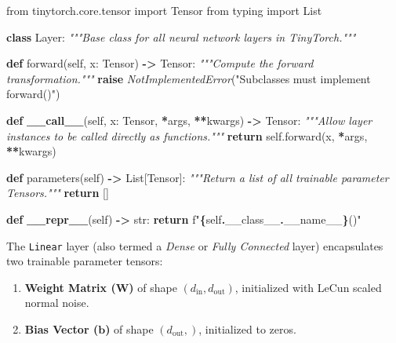 \documentclass[
  letterpaper,
]{scrbook}
\newenvironment{Shaded}{\begin{snugshade}}{\end{snugshade}}
\newcommand{\BuiltInTok}[1]{#1}
\newcommand{\CommentTok}[1]{\textcolor[rgb]{0.56,0.35,0.01}{\textit{#1}}}
\newcommand{\ControlFlowTok}[1]{\textcolor[rgb]{0.13,0.29,0.53}{\textbf{#1}}}
\newcommand{\FunctionTok}[1]{\textcolor[rgb]{0.13,0.29,0.53}{\textbf{#1}}}
\newcommand{\ImportTok}[1]{#1}
\newcommand{\KeywordTok}[1]{\textcolor[rgb]{0.13,0.29,0.53}{\textbf{#1}}}
\newcommand{\NormalTok}[1]{#1}
\newcommand{\OperatorTok}[1]{\textcolor[rgb]{0.81,0.36,0.00}{\textbf{#1}}}
\newcommand{\PreprocessorTok}[1]{\textcolor[rgb]{0.56,0.35,0.01}{\textit{#1}}}
\newcommand{\SpecialCharTok}[1]{\textcolor[rgb]{0.81,0.36,0.00}{\textbf{#1}}}
\newcommand{\SpecialStringTok}[1]{\textcolor[rgb]{0.31,0.60,0.02}{#1}}
\newcommand{\StringTok}[1]{\textcolor[rgb]{0.31,0.60,0.02}{#1}}
\newcommand{\VariableTok}[1]{\textcolor[rgb]{0.00,0.00,0.00}{#1}}
\providecommand{\tightlist}{%
  \setlength{\itemsep}{0pt}\setlength{\parskip}{0pt}}
\begin{document}
\begin{Shaded}
\begin{Highlighting}[]
\ImportTok{from}\NormalTok{ tinytorch.core.tensor }\ImportTok{import}\NormalTok{ Tensor}
\ImportTok{from}\NormalTok{ typing }\ImportTok{import}\NormalTok{ List}

\KeywordTok{class}\NormalTok{ Layer:}
    \CommentTok{"""Base class for all neural network layers in TinyTorch."""}

    \KeywordTok{def}\NormalTok{ forward(}\VariableTok{self}\NormalTok{, x: Tensor) }\OperatorTok{{-}\textgreater{}}\NormalTok{ Tensor:}
        \CommentTok{"""Compute the forward transformation."""}
        \ControlFlowTok{raise} \PreprocessorTok{NotImplementedError}\NormalTok{(}\StringTok{"Subclasses must implement forward()"}\NormalTok{)}

    \KeywordTok{def} \FunctionTok{\_\_call\_\_}\NormalTok{(}\VariableTok{self}\NormalTok{, x: Tensor, }\OperatorTok{*}\NormalTok{args, }\OperatorTok{**}\NormalTok{kwargs) }\OperatorTok{{-}\textgreater{}}\NormalTok{ Tensor:}
        \CommentTok{"""Allow layer instances to be called directly as functions."""}
        \ControlFlowTok{return} \VariableTok{self}\NormalTok{.forward(x, }\OperatorTok{*}\NormalTok{args, }\OperatorTok{**}\NormalTok{kwargs)}

    \KeywordTok{def}\NormalTok{ parameters(}\VariableTok{self}\NormalTok{) }\OperatorTok{{-}\textgreater{}}\NormalTok{ List[Tensor]:}
        \CommentTok{"""Return a list of all trainable parameter Tensors."""}
        \ControlFlowTok{return}\NormalTok{ []}

    \KeywordTok{def} \FunctionTok{\_\_repr\_\_}\NormalTok{(}\VariableTok{self}\NormalTok{) }\OperatorTok{{-}\textgreater{}} \BuiltInTok{str}\NormalTok{:}
        \ControlFlowTok{return} \SpecialStringTok{f"}\SpecialCharTok{\{}\VariableTok{self}\SpecialCharTok{.}\VariableTok{\_\_class\_\_}\SpecialCharTok{.}\VariableTok{\_\_name\_\_}\SpecialCharTok{\}}\SpecialStringTok{()"}
\end{Highlighting}
\end{Shaded}

The \texttt{Linear} layer (also termed a \emph{Dense} or \emph{Fully
Connected} layer) encapsulates two trainable parameter tensors:

\begin{enumerate}
\def\labelenumi{\arabic{enumi}.}
\tightlist
\item
  \textbf{Weight Matrix (\(\mathbf{W}\))} of shape
  \((d_{\text{in}}, d_{\text{out}})\), initialized with LeCun scaled
  normal noise.
\item
  \textbf{Bias Vector (\(\mathbf{b}\))} of shape \((d_{\text{out}},)\),
  initialized to zeros.
\end{enumerate}
\end{document}
